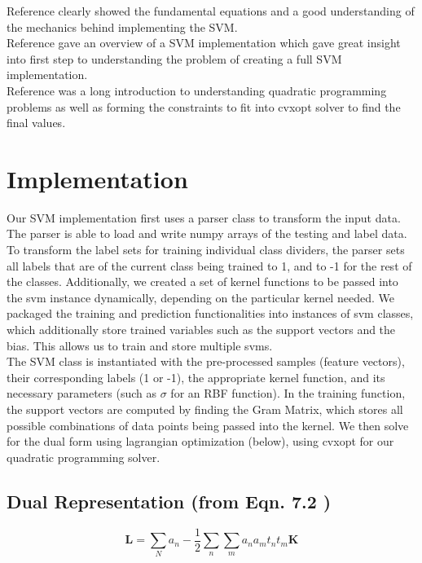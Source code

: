 \documentclass[journal]{IEEEtran}
\begin{document}
Reference \cite{BishopBook} clearly showed the fundamental equations and a good understanding of the mechanics behind implementing the SVM.\\

Reference \cite{TullochSVMpy} gave an overview of a SVM implementation which gave great insight into first step to understanding the problem of creating a full SVM implementation.\\

Reference \cite{QuadraticCVXOPT} was a long introduction to understanding quadratic programming problems as well as forming the constraints to fit into cvxopt solver to find the final values.\\




\section{Implementation}
    Our SVM implementation first uses a parser class to transform the input data.  The parser is able to load and write numpy arrays of the testing and label data.  To transform the label sets for training individual class dividers, the parser sets all labels that are of the current class being trained to 1, and to -1 for the rest of the classes.  Additionally, we created a set of kernel functions to be passed into the svm instance dynamically, depending on the particular kernel needed.  We packaged the training and prediction functionalities into instances of svm classes, which additionally store trained variables such as the support vectors and the bias.  This allows us to train and store multiple svms.\\

    The SVM class is instantiated with the pre-processed samples (feature vectors), their corresponding labels (1 or -1), the appropriate kernel function, and its necessary parameters (such as $\sigma$ for an RBF function).  In the training function, the support vectors are computed by finding the Gram Matrix, which stores all possible combinations of data points being passed into the kernel. We then solve for the dual form using lagrangian optimization (below), using cvxopt for our quadratic programming solver.

    \subsection{Dual Representation (from Eqn. 7.2 \cite{BishopBook})}
    \begin{equation}
    \mathbf{L} = \sum\limits_{N} a_n - \frac{1}{2} \sum\limits_{n} \sum\limits_{m} a_n a_m t_n t_m \mathbf{K}
    \end{equation}
\end{document}
